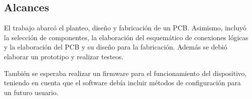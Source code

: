 \subsection{Alcances}



El trabajo abarcó el planteo, diseño y fabricación de un PCB. Asimismo, incluyó la selección de componentes, la elaboración del esquemático de conexiones lógicas y la elaboración del PCB y su diseño para la fabricación. Además se debió elaborar un prototipo y realizar testeos.

También se esperaba realizar un firmware para el funcionamiento del dispositivo, teniendo en cuenta que el software debía incluir métodos de configuración para un futuro usuario.

